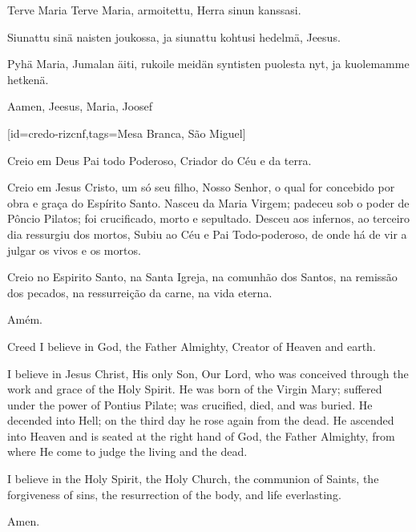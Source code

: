   \begin{passage}[FI]{Terve Maria}
    Terve Maria, armoitettu,
    Herra sinun kanssasi.
    \par
    Siunattu sinä naisten joukossa,
    ja siunattu kohtusi hedelmä, Jeesus.
    \par
    Pyhä Maria, Jumalan äiti, rukoile meidän
    syntisten puolesta nyt, ja kuolemamme hetkenä.
    \par
    Aamen, Jeesus, Maria, Joosef
  \end{passage}
  \vspace*{\fill}
\endsong


[id={credo-rizcnf},tags={Mesa Branca, São Miguel}]
  \begin{passage}[PT]{}
    Creio em Deus Pai todo Poderoso,
    Criador do Céu e da terra.
    \par
    Creio em Jesus Cristo, um só seu filho, Nosso
    Senhor, o qual for concebido por obra e graça do
    Espírito Santo. Nasceu da Maria Virgem;
    padeceu sob o poder de Pôncio Pilatos;
    foi crucificado, morto e sepultado. Desceu aos
    infernos, ao terceiro dia ressurgiu dos mortos,
    Subiu ao Céu e Pai Todo-poderoso, de onde há de vir
    a julgar os vivos e os mortos.
    \par
    Creio no Espirito Santo, na Santa Igreja,
    na comunhão dos Santos, na remissão
    dos pecados, na ressurreição da carne,
    na vida eterna.
    \par
    Amém.
  \end{passage}
  \hardbrk
  \begin{passage}[EN]{Creed}
    I believe in God, the Father Almighty,
    Creator of Heaven and earth.
    \par
    I believe in Jesus Christ, His only Son, Our Lord,
    who was conceived through the work and grace of
    the Holy Spirit. He was born of the Virgin Mary;
    suffered under the power of Pontius Pilate;
    was crucified, died, and was buried. He decended
    into Hell; on the third day he rose again from
    the dead. He ascended into Heaven and is seated
    at the right hand of God, the Father Almighty, from
    where He come to judge the living and the dead.
    \par
    I believe in the Holy Spirit, the Holy Church,
    the communion of Saints, the forgiveness of sins,
    the resurrection of the body, and life everlasting.
    \par
    Amen.
  \end{passage}
